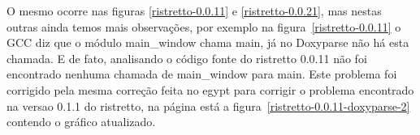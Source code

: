 O mesmo ocorre nas figuras \ref{ristretto-0.0.11} e \ref{ristretto-0.0.21}, mas
nestas outras ainda temos mais observações, por exemplo na
figura~\ref{ristretto-0.0.11} o GCC diz que o módulo main\_window chama main,
já no Doxyparse não há esta chamada. E de fato, analisando o código fonte do ristretto 0.0.11 não foi encontrado nenhuma chamada de main\_window para main. Este problema foi corrigido pela mesma correção feita no egypt para corrigir o problema encontrado na versao 0.1.1 do ristretto, na página \pageref{ristretto-0.1.11-doxyparse-2} está a figura~\ref{ristretto-0.0.11-doxyparse-2} contendo o gráfico atualizado.

\begin{figure}
\center
{}
\qquad
{}
\end{figure}

